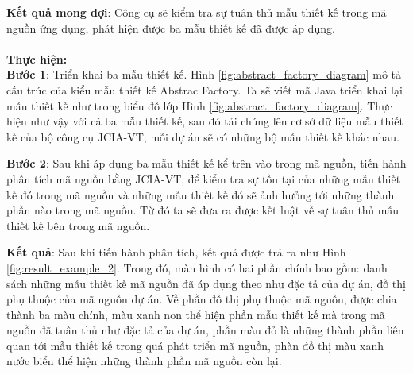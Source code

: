 \documentclass[12pt]{report}
\begin{document}
\noindent \textbf{Kết quả mong đợi}: Công cụ sẽ kiểm tra sự tuân thủ mẫu thiết kế trong mã nguồn ứng dụng, phát hiện được ba mẫu thiết kế đã được áp dụng.\\\\
\noindent \textbf{Thực hiện:}\\
\noindent \textbf{Bước 1}: Triển khai ba mẫu thiết kế. Hình \ref{fig:abstract_factory_diagram} mô tả cấu trúc của kiểu mẫu thiết kế Abstrac Factory. Ta sẽ viết mã Java triển khai lại mẫu thiết kế như trong biểu đồ lớp Hình \ref{fig:abstract_factory_diagram}. Thực hiện như vậy với cả ba mẫu thiết kế, sau đó tải chúng lên cơ sở dữ liệu mẫu thiết kế của bộ công cụ JCIA-VT, mỗi dự án sẽ có những bộ mẫu thiết kế khác nhau.

\noindent \textbf{Bước 2}: Sau khi áp dụng ba mẫu thiết kế kể trên vào trong mã nguồn, tiến hành phân tích mã nguồn bằng JCIA-VT, để kiểm tra sự tồn tại của những mẫu thiết kế đó trong mã nguồn và những mẫu thiết kế đó sẽ ảnh hưởng tới những thành phần nào trong mã nguồn. Từ đó ta sẽ đưa ra được kết luật về sự tuân thủ mẫu thiết kế bên trong mã nguồn.

\noindent \textbf{Kết quả}: Sau khi tiến hành phân tích, kết quả được trả ra như Hình \ref{fig:result_example_2}. Trong đó, màn hình có hai phần chính bao gồm: danh sách những mẫu thiết kế mã nguồn đã áp dụng theo như đặc tả của dự án, đồ thị phụ thuộc của mã nguồn dự án. Về phần đồ thị phụ thuộc mã nguồn, được chia thành ba màu chính, màu xanh non thể hiện phần mẫu thiết kế mà trong mã nguồn đã tuân thủ như đặc tả của dự án, phần màu đỏ là những thành phần liên quan tới mẫu thiết kế trong quá phát triển mã nguồn, phàn đồ thị màu xanh nước biển thể hiện những thành phần mã nguồn còn lại.
\end{document}
